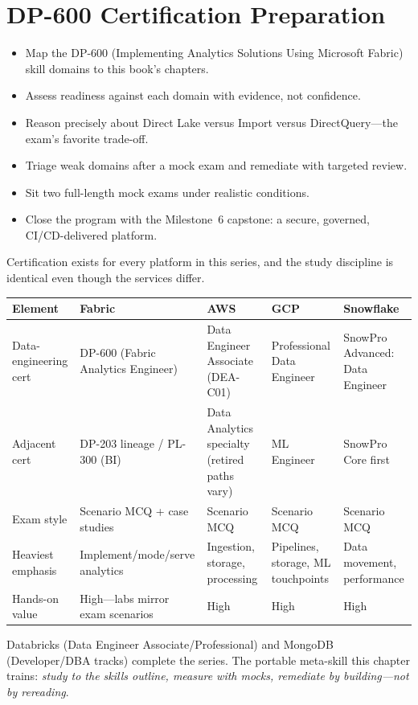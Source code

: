 \chapter{DP-600 Certification Preparation}
%

\begin{objectives}
\begin{itemize}
    \item Map the DP-600 (Implementing Analytics Solutions Using Microsoft Fabric) skill domains to this book's chapters.
    \item Assess readiness against each domain with evidence, not confidence.
    \item Reason precisely about Direct Lake versus Import versus DirectQuery---the exam's favorite trade-off.
    \item Triage weak domains after a mock exam and remediate with targeted review.
    \item Sit two full-length mock exams under realistic conditions.
    \item Close the program with the Milestone~6 capstone: a secure, governed, CI/CD-delivered platform.
\end{itemize}
\end{objectives}

\begin{crosscloud}
Certification exists for every platform in this series, and the study discipline is identical even though the services differ.

\vspace{2mm}
{\footnotesize
\begin{tabular}{@{}p{2.8cm}p{3.2cm}p{3.2cm}p{3.2cm}p{3.2cm}@{}}
\toprule
\textbf{Element} & \textbf{Fabric} & \textbf{AWS} & \textbf{GCP} & \textbf{Snowflake} \\
\midrule
Data-engineering cert & DP-600 (Fabric Analytics Engineer) & Data Engineer Associate (DEA-C01) & Professional Data Engineer & SnowPro Advanced: Data Engineer \\
Adjacent cert & DP-203 lineage / PL-300 (BI) & Data Analytics specialty (retired paths vary) & ML Engineer & SnowPro Core first \\
Exam style & Scenario MCQ + case studies & Scenario MCQ & Scenario MCQ & Scenario MCQ \\
Heaviest emphasis & Implement/mode/serve analytics & Ingestion, storage, processing & Pipelines, storage, ML touchpoints & Data movement, performance \\
Hands-on value & High---labs mirror exam scenarios & High & High & High \\
\bottomrule
\end{tabular}}

\vspace{1mm}
Databricks (Data Engineer Associate/Professional) and MongoDB (Developer/DBA tracks) complete the series. The portable meta-skill this chapter trains: \emph{study to the skills outline, measure with mocks, remediate by building---not by rereading}.
\end{crosscloud}

